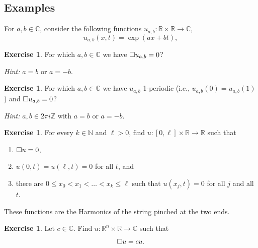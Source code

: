 \documentclass[a4paper,9pt]{amsart}
\newcommand{\N}{\mathbb{N}}	%
\newcommand{\Z}{\mathbb{Z}}	%
\newcommand{\R}{\mathbb{R}}	%
\newcommand{\C}{\mathbb{C}}	%
\theoremstyle{plain}
\theoremstyle{definition}
\newtheorem{exercise}[proposition]{Exercise}%
\theoremstyle{remark}
\begin{document}
\subsection{Examples}
For $a,b\in\C$,
consider the following functions $u_{a,b}:\R\times\R\to\C$,
\begin{equation}
	u_{a,b}(x,t) = \exp(ax + bt) ,
\end{equation}
\begin{exercise}
	For which $a,b\in\C$ we have $\square u_{a,b}=0$?
	
	{\it Hint:} $a=b$ or $a=-b$.
\end{exercise}
\begin{exercise}
	For which $a,b\in\C$ we have $u_{a,b}$ 1-periodic (i.e., $u_{a,b}(0) = u_{a,b}(1)$)
	and $\square u_{a,b}=0$?
	
	{\it Hint:} $a,b\in 2\pi i\Z$ with $a=b$ or $a=-b$.
\end{exercise}
\begin{exercise}
	For every $k\in\N$ and $\ell>0$, find $u:[0,\ell]\times\R\to\R$ such that 
	\begin{enumerate}
	\item	$\square u = 0$,
	\item	$u(0,t) = u(\ell,t) = 0$ for all $t$, and
	\item	there are $0\le x_0 < x_1 < \dots < x_k \le \ell$ such that $u(x_j,t) = 0$ for all $j$ and all $t$.
	\end{enumerate}	
	These functions are the Harmonics of the string pinched at the two ends.
\end{exercise}

\begin{exercise}
	Let $c\in\C$.
	Find $u:\R^n\times\R\to\C$ such that
	\begin{equation}
		\square u = c u .
	\end{equation}
%
\end{exercise}

\end{document}
